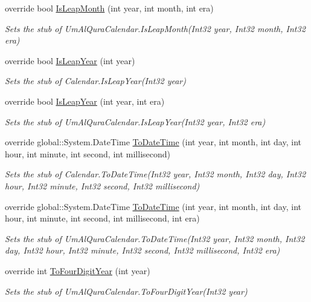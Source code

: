 \begin{DoxyCompactItemize}
override bool \hyperlink{class_system_1_1_globalization_1_1_fakes_1_1_stub_um_al_qura_calendar_a0fcb38bfa82b31ae6b801a0fe7eea8ff}{Is\-Leap\-Month} (int year, int month, int era)
\begin{DoxyCompactList}\small\item\em Sets the stub of Um\-Al\-Qura\-Calendar.\-Is\-Leap\-Month(\-Int32 year, Int32 month, Int32 era)\end{DoxyCompactList}\item 
override bool \hyperlink{class_system_1_1_globalization_1_1_fakes_1_1_stub_um_al_qura_calendar_a2ad63d43780773b9f3153215936052cf}{Is\-Leap\-Year} (int year)
\begin{DoxyCompactList}\small\item\em Sets the stub of Calendar.\-Is\-Leap\-Year(\-Int32 year)\end{DoxyCompactList}\item 
override bool \hyperlink{class_system_1_1_globalization_1_1_fakes_1_1_stub_um_al_qura_calendar_a8fe38023ad973c58666fe989aaedff53}{Is\-Leap\-Year} (int year, int era)
\begin{DoxyCompactList}\small\item\em Sets the stub of Um\-Al\-Qura\-Calendar.\-Is\-Leap\-Year(\-Int32 year, Int32 era)\end{DoxyCompactList}\item 
override global\-::\-System.\-Date\-Time \hyperlink{class_system_1_1_globalization_1_1_fakes_1_1_stub_um_al_qura_calendar_ab5d6808d8b099cf01b31a33facd97421}{To\-Date\-Time} (int year, int month, int day, int hour, int minute, int second, int millisecond)
\begin{DoxyCompactList}\small\item\em Sets the stub of Calendar.\-To\-Date\-Time(\-Int32 year, Int32 month, Int32 day, Int32 hour, Int32 minute, Int32 second, Int32 millisecond)\end{DoxyCompactList}\item 
override global\-::\-System.\-Date\-Time \hyperlink{class_system_1_1_globalization_1_1_fakes_1_1_stub_um_al_qura_calendar_ac2059d3495e6610eb48dd43570496aa7}{To\-Date\-Time} (int year, int month, int day, int hour, int minute, int second, int millisecond, int era)
\begin{DoxyCompactList}\small\item\em Sets the stub of Um\-Al\-Qura\-Calendar.\-To\-Date\-Time(\-Int32 year, Int32 month, Int32 day, Int32 hour, Int32 minute, Int32 second, Int32 millisecond, Int32 era)\end{DoxyCompactList}\item 
override int \hyperlink{class_system_1_1_globalization_1_1_fakes_1_1_stub_um_al_qura_calendar_a4bc8542571f606fd3aaac1b9438d862f}{To\-Four\-Digit\-Year} (int year)
\begin{DoxyCompactList}\small\item\em Sets the stub of Um\-Al\-Qura\-Calendar.\-To\-Four\-Digit\-Year(\-Int32 year)\end{DoxyCompactList}\end{DoxyCompactItemize}
